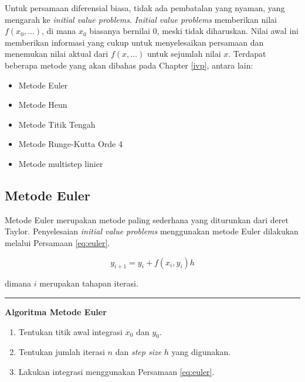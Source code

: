\documentclass[
]{book}
\providecommand{\tightlist}{%
  \setlength{\itemsep}{0pt}\setlength{\parskip}{0pt}}
\theoremstyle{definition}
\theoremstyle{definition}
\theoremstyle{definition}
\theoremstyle{definition}
\theoremstyle{remark}
\begin{document}
Untuk persamaan diferensial biasa, tidak ada pembatalan yang nyaman, yang mengarah ke \emph{initial value problems}. \emph{Initial value problems} memberikan nilai \(f\left(x_0,\dots\right)\), di mana \(x_0\) biasanya bernilai 0, meski tidak diharuskan. Nilai awal ini memberikan informasi yang cukup untuk menyelesaikan persamaan dan menemukan nilai aktual dari \(f\left(x,\dots\right)\) untuk sejumlah nilai \(x\). Terdapat beberapa metode yang akan dibahas pada Chapter \ref{ivp}, antara lain:

\begin{itemize}
\tightlist
\item
  Metode Euler
\item
  Metode Heun
\item
  Metode Titik Tengah
\item
  Metode Runge-Kutta Orde 4
\item
  Metode multistep linier
\end{itemize}

\hypertarget{eulermethod}{%
\subsection{Metode Euler}\label{eulermethod}}

Metode Euler merupakan metode paling sederhana yang diturunkan dari deret Taylor. Penyelesaian \emph{initial value problems} menggunakan metode Euler dilakukan melalui Persamaan \eqref{eq:euler}.

\begin{equation}
y_{i+1}=y_i+f\left(x_i,y_i\right)h
  \label{eq:euler}
\end{equation}

dimana \(i\) merupakan tahapan iterasi.

\begin{center}\rule{0.5\linewidth}{0.5pt}\end{center}

\textbf{Algoritma Metode Euler}

\begin{enumerate}
\def\labelenumi{\arabic{enumi}.}
\tightlist
\item
  Tentukan titik awal integrasi \(x_0\) dan \(y_0\).
\item
  Tentukan jumlah iterasi \(n\) dan \emph{step size} \(h\) yang digunakan.
\item
  Lakukan integrasi menggunakan Persamaan \eqref{eq:euler}.
\end{enumerate}
\end{document}
